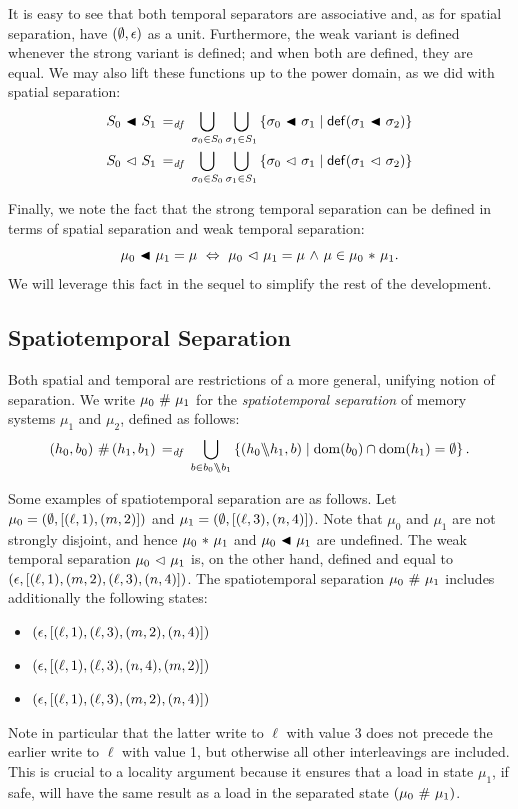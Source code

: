 \documentclass[11pt]{report}
\begin{document}
It is easy to see that both temporal separators are associative and, as for spatial separation, have $(\operatorname{\emptyset},\epsilon)$ as a unit. Furthermore, the weak variant is defined whenever the strong variant is defined; and when both are defined, they are equal. We may also lift these functions up to the power domain, as we did with spatial separation: \begin{align*}
    S_0 \operatorname{\,\blacktriangleleft\,} S_1 \operatorname{\;=_{\mathit{df}}\;} \bigcup_{\sigma_0 \in S_0} \bigcup_{\sigma_1 \in S_1} \left\lbrace \sigma_0 \operatorname{\,\blacktriangleleft\,} \sigma_1 \mid \mathsf{def}(\sigma_1 \operatorname{\,\blacktriangleleft\,} \sigma_2) \right\rbrace \\ 
    S_0 \operatorname{\,\vartriangleleft\,} S_1 \operatorname{\;=_{\mathit{df}}\;} \bigcup_{\sigma_0 \in S_0} \bigcup_{\sigma_1 \in S_1} \left\lbrace \sigma_0 \operatorname{\,\vartriangleleft\,} \sigma_1 \mid \mathsf{def}(\sigma_1 \operatorname{\,\vartriangleleft\,} \sigma_2) \right\rbrace
\end{align*}

Finally, we note the fact that the strong temporal separation can be defined in terms of spatial separation and weak temporal separation: \[ \mu_0 \operatorname{\,\blacktriangleleft\,} \mu_1 = \mu \,\,\Leftrightarrow\,\, \mu_0 \operatorname{\,\vartriangleleft\,} \mu_1 = \mu \operatorname{\,\wedge\,} \mu \in \mu_0 \operatorname{\,\ast\,} \mu_1.\] We will leverage this fact in the sequel to simplify the rest of the development. 

\subsection{Spatiotemporal Separation}
\label{sec:sequential-spatiotemporal-separation}

Both spatial and temporal are restrictions of a more general, unifying notion of separation. We write $\mu_0 \operatorname{\,\#\,} \mu_1$ for the \emph{spatiotemporal separation} of memory systems $\mu_1$ and $\mu_2$, defined as follows: \[ (h_0,b_0) \operatorname{\,\#\,} (h_1,b_1) \operatorname{\;=_{\mathit{df}}\;} \bigcup_{b \in b_0 \backslash\!\!\backslash b_1} \left\lbrace (h_0 \backslash\!\!\backslash h_1, b) \mid \operatorname{\mathrm{dom}}(b_0) \cap \operatorname{\mathrm{dom}}(h_1) = \operatorname{\emptyset} \right\rbrace.\] 

Some examples of spatiotemporal separation are as follows. Let $\mu_0 = (\operatorname{\emptyset},\left[(\ell,1),(m,2)\right])$ and $\mu_1 = (\operatorname{\emptyset},\left[(\ell,3),(n,4)\right])$. Note that $\mu_0$ and $\mu_1$ are not strongly disjoint, and hence $\mu_0 \operatorname{\,\ast\,} \mu_1$ and $\mu_0 \operatorname{\,\blacktriangleleft\,} \mu_1$ are undefined. The weak temporal separation $\mu_0 \operatorname{\,\vartriangleleft\,} \mu_1$ is, on the other hand, defined and equal to $(\epsilon,\left[(\ell,1),(m,2),(\ell,3),(n,4)\right])$. The spatiotemporal separation $\mu_0 \operatorname{\,\#\,} \mu_1$ includes additionally the following states: \begin{itemize} \item $(\epsilon,\left[(\ell,1),(\ell,3),(m,2),(n,4)\right])$
  \item $(\epsilon,\left[(\ell,1),(\ell,3),(n,4),(m,2)\right])$
  \item $(\epsilon,\left[(\ell,1),(\ell,3),(m,2),(n,4)\right])$
\end{itemize} Note in particular that the latter write to $\ell$ with value $3$ does not precede the earlier write to $\ell$ with value 1, but otherwise all other interleavings are included. This is crucial to a locality argument because it ensures that a load in state $\mu_1$, if safe, will have the same result as a load in the separated state $(\mu_0 \operatorname{\,\#\,} \mu_1)$. 
\end{document}
